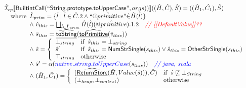 \[
\begin{array}{l}

\hat{\mathcal{I}} _{cp}\llbracket \mbox{\textsf{BuiltintCall}}(``\mbox{\textsf{String.prototype.toUpperCase}}",args))\rrbracket((\hat{H},\hat{C}), \hat{S})
  = ((\hat{H}_1, \hat{C_1}), \hat{S})\\
\quad{\rm where}\begin{array}[t]{l} 
  \hat{L}_{prim} = \{ \hat{l} \mid \hat{l} \in \hat{C}.2 \land ``\hat{@primitive}" \dot{\in}\hat{H}(\hat{l}) \}\\
  \land\ \hat{v}_{this} = \bigsqcup_{\hat{l} \in \hat{L}_{prim}} \hat{H}(\hat{l})(\hat{@primitive}).1.2
    \quad\textit{{\color{red}// [[DefaultValue]]??}}\\
  \land\ \hat{s}_{this} = \widehat{\underline{\sf toString}}(\widehat{\underline{\sf toPrimitive}}(\hat{v}_{this}))\\
  \land\ \hat{s} = \left\{\begin{array}{ll}
      \bot_{string} & {\rm if}\begin{array}[t]{l}\hat{s}_{this} = \bot_{string}\end{array}\\
      \hat{s}' & {\rm if}\begin{array}[t]{l}\hat{s}_{this} = \mbox{\textsf{NumStrSingle}}(s_{this}) \lor \hat{s}_{this} = \mbox{\textsf{OtherStrSingle}}(s_{this}) \end{array}\\
      \top_{string} & {\rm otherwise}
    \end{array}\right.\\
  \land\ \hat{s}' = \alpha({\color{blue} native.string.toUpperCase}(s_{this}))
    \quad\textit{{\color{blue}// java, scala}}\\  
  \land\ (\hat{H}_1, \hat{C}_1) = 
    \left\{\begin{array}{ll}
      (\widehat{\underline{\sf ReturnStore}}(\hat{H}, Value(\hat{s}))), \hat{C})
      & {\rm if}\begin{array}[t]{l}\hat{s} \not\sqsubseteq \bot_{String}\end{array}\\
      (\bot_{heap}, \bot_{context}) & {\rm otherwise} \\
    \end{array}\right.\\
  \end{array}\\
\\\\



\end{array}\]
